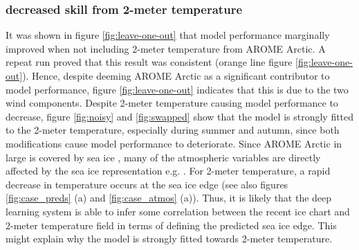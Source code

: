 \documentclass[../main/thesis]{subfiles}
\begin{document}
\subsubsection{decreased skill from 2-meter temperature}
\label{sec:discuss_seggrad_t2m}
It was shown in figure \ref{fig:leave-one-out} that model performance marginally improved when not including 2-meter temperature from AROME Arctic. A repeat run proved that this result was consistent (orange line figure \ref{fig:leave-one-out}). Hence, despite deeming AROME Arctic as a significant contributor to model performance, figure \ref{fig:leave-one-out} indicates that this is due to the two wind components. Despite 2-meter temperature causing model performance to decrease, figure \ref{fig:noisy} and \ref{fig:swapped} show that the model is strongly fitted to the 2-meter temperature, especially during summer and autumn, since both modifications cause model performance to deteriorate. Since AROME Arctic in large is covered by sea ice \citep{Mueller2017}, many of the atmospheric variables are directly affected by the sea ice representation e.g. \citep{Mueller2017, Batrak2018, Batrak2019, Mueller2023}. For 2-meter temperature, a rapid decrease in temperature occurs at the sea ice edge \citep{Mueller2023} (see also figures \ref{fig:case_preds} (a) and \ref{fig:case_atmos} (a)). Thus, it is likely that the deep learning system is able to infer some correlation between the recent ice chart and 2-meter temperature field in terms of defining the predicted sea ice edge. This might explain why the model is strongly fitted towards 2-meter temperature. 
\end{document}
